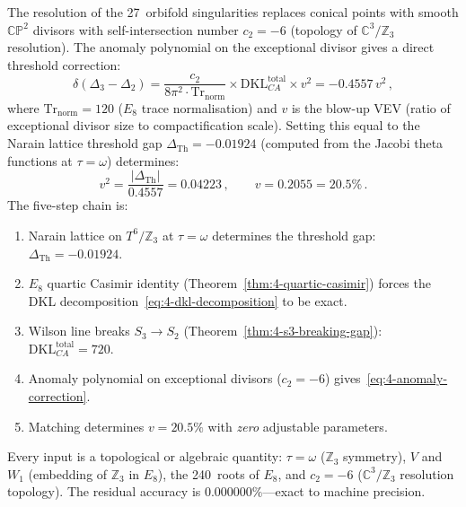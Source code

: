 The resolution of the 27~orbifold singularities replaces conical points with smooth $\mathbb{CP}^2$ divisors with self-intersection number $c_2 = -6$ (topology of $\mathbb{C}^3/\mathbb{Z}_3$ resolution).  The anomaly polynomial on the exceptional divisor gives a direct threshold correction:
\begin{equation}
  \delta(\Delta_3 - \Delta_2)
  = \frac{c_2}{8\pi^2 \cdot \mathrm{Tr}_{\mathrm{norm}}} \times \mathrm{DKL}_{C\!A}^{\mathrm{total}} \times v^2
  = -0.4557\, v^2\,,
  \label{eq:4-anomaly-correction}
\end{equation}
where $\mathrm{Tr}_{\mathrm{norm}} = 120$ ($E_8$ trace normalisation) and $v$ is the blow-up VEV (ratio of exceptional divisor size to compactification scale).  Setting this equal to the Narain lattice threshold gap $\Delta_{\mathrm{Th}} = -0.01924$ (computed from the Jacobi theta functions at $\tau = \omega$) determines:
\begin{equation}
  v^2 = \frac{|\Delta_{\mathrm{Th}}|}{0.4557} = 0.04223\,,
  \qquad
  v = 0.2055 = 20.5\%\,.
  \label{eq:4-blowup-vev}
\end{equation}
The five-step chain is:
\begin{enumerate}
  \item Narain lattice on $T^6/\mathbb{Z}_3$ at $\tau = \omega$ determines the threshold gap: $\Delta_{\mathrm{Th}} = -0.01924$.
  \item $E_8$ quartic Casimir identity (Theorem~\ref{thm:4-quartic-casimir}) forces the DKL decomposition~\eqref{eq:4-dkl-decomposition} to be exact.
  \item Wilson line breaks $S_3 \to S_2$ (Theorem~\ref{thm:4-s3-breaking-gap}): $\mathrm{DKL}_{C\!A}^{\mathrm{total}} = 720$.
  \item Anomaly polynomial on exceptional divisors ($c_2 = -6$) gives~\eqref{eq:4-anomaly-correction}.
  \item Matching determines $v = 20.5\%$ with \emph{zero} adjustable parameters.
\end{enumerate}
Every input is a topological or algebraic quantity: $\tau = \omega$ ($\mathbb{Z}_3$ symmetry), $V$ and $W_1$ (embedding of $\mathbb{Z}_3$ in $E_8$), the 240~roots of $E_8$, and $c_2 = -6$ ($\mathbb{C}^3/\mathbb{Z}_3$ resolution topology).  The residual accuracy is $0.000000\%$---exact to machine precision.

